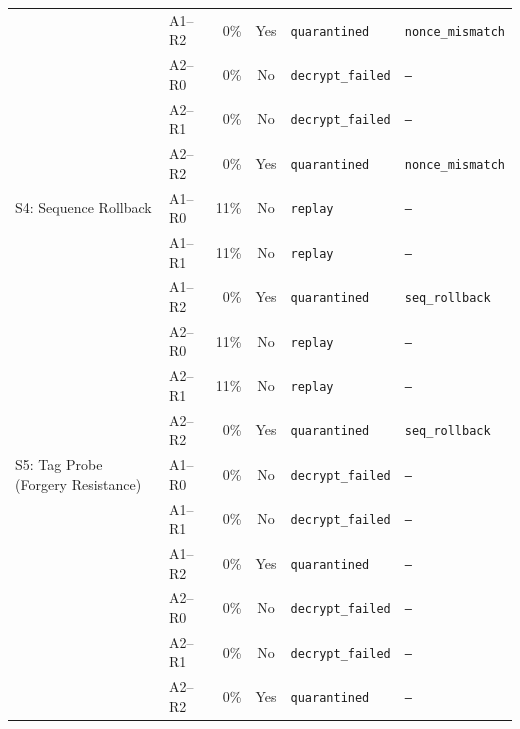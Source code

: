 \begin{table}[htbp]
\begin{tabular}{l l r c l l}
   & A1--R2 & 0\% & Yes & \texttt{quarantined} & \texttt{nonce\_mismatch} \\
   & A2--R0 & 0\% & No & \texttt{decrypt\_failed} & \texttt{--} \\
   & A2--R1 & 0\% & No & \texttt{decrypt\_failed} & \texttt{--} \\
   & A2--R2 & 0\% & Yes & \texttt{quarantined} & \texttt{nonce\_mismatch} \\
\midrule
  S4: Sequence Rollback & A1--R0 & 11\% & No & \texttt{replay} & \texttt{--} \\
   & A1--R1 & 11\% & No & \texttt{replay} & \texttt{--} \\
   & A1--R2 & 0\% & Yes & \texttt{quarantined} & \texttt{seq\_rollback} \\
   & A2--R0 & 11\% & No & \texttt{replay} & \texttt{--} \\
   & A2--R1 & 11\% & No & \texttt{replay} & \texttt{--} \\
   & A2--R2 & 0\% & Yes & \texttt{quarantined} & \texttt{seq\_rollback} \\
\midrule
  S5: Tag Probe (Forgery Resistance) & A1--R0 & 0\% & No & \texttt{decrypt\_failed} & \texttt{--} \\
   & A1--R1 & 0\% & No & \texttt{decrypt\_failed} & \texttt{--} \\
   & A1--R2 & 0\% & Yes & \texttt{quarantined} & \texttt{--} \\
   & A2--R0 & 0\% & No & \texttt{decrypt\_failed} & \texttt{--} \\
   & A2--R1 & 0\% & No & \texttt{decrypt\_failed} & \texttt{--} \\
   & A2--R2 & 0\% & Yes & \texttt{quarantined} & \texttt{--} \\
\bottomrule
\end{tabular}
\end{table}